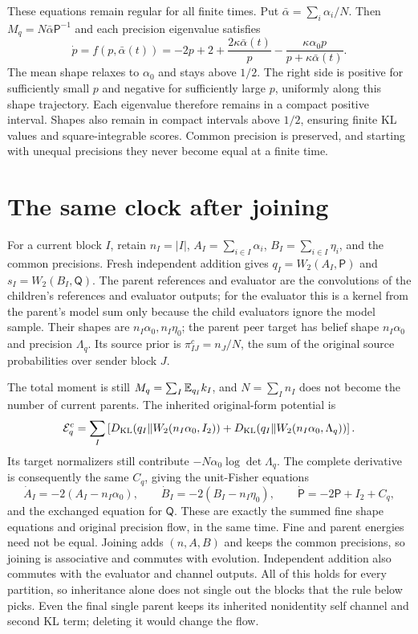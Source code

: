 These equations remain regular for all finite times. Put $\bar\alpha=\sum_i\alpha_i/N$. Then $M_q=N\bar\alpha\mathsf P^{-1}$ and each precision eigenvalue satisfies
\begin{equation}
 \dot p=f(p,\bar\alpha(t))
 =-2p+2+\frac{2\kappa\bar\alpha(t)}p
 -\frac{\kappa\alpha_0p}{p+\kappa\bar\alpha(t)}.
 \label{cf:eigenvalue}
\end{equation}
The mean shape relaxes to $\alpha_0$ and stays above $1/2$. The right side is positive for sufficiently small $p$ and negative for sufficiently large $p$, uniformly along this shape trajectory. Each eigenvalue therefore remains in a compact positive interval. Shapes also remain in compact intervals above $1/2$, ensuring finite KL values and square-integrable scores. Common precision is preserved, and starting with unequal precisions they never become equal at a finite time.

\section{The same clock after joining}
\label{cf:parent}

For a current block $I$, retain $n_I=|I|$, $A_I=\sum_{i\in I}\alpha_i$, $B_I=\sum_{i\in I}\eta_i$, and the common precisions. Fresh independent addition gives $q_I=W_2(A_I,\mathsf P)$ and $s_I=W_2(B_I,\mathsf Q)$. The parent references and evaluator are the convolutions of the children's references and evaluator outputs; for the evaluator this is a kernel from the parent's model sum only because the child evaluators ignore the model sample. Their shapes are $n_I\alpha_0,n_I\eta_0$; the parent peer target has belief shape $n_I\alpha_0$ and precision $\Lambda_q$. Its source prior is $\pi^c_{IJ}=n_J/N$, the sum of the original source probabilities over sender block $J$.

The total moment is still $M_q=\sum_I\mathbb E_{q_I}k_I$, and $N=\sum_In_I$ does not become the number of current parents. The inherited original-form potential is
\begin{equation}
 \mathcal E_q^c=\sum_I\left[
 D_{\mathrm{KL}}(q_I\Vert W_2(n_I\alpha_0,I_2))
 +D_{\mathrm{KL}}(q_I\Vert W_2(n_I\alpha_0,\Lambda_q))\right].
\end{equation}
Its target normalizers still contribute $-N\alpha_0\log\det\Lambda_q$. The complete derivative is consequently the same $C_q$, giving the unit-Fisher equations
\begin{equation}
 \dot A_I=-2(A_I-n_I\alpha_0),
 \qquad \dot B_I=-2(B_I-n_I\eta_0),
 \qquad \dot{\mathsf P}=-2\mathsf P+I_2+C_q,
 \label{cf:parent-flow}
\end{equation}
and the exchanged equation for $\mathsf Q$. These are exactly the summed fine shape equations and original precision flow, in the same time. Fine and parent energies need not be equal. Joining adds $(n,A,B)$ and keeps the common precisions, so joining is associative and commutes with evolution. Independent addition also commutes with the evaluator and channel outputs. All of this holds for every partition, so inheritance alone does not single out the blocks that the rule below picks. Even the final single parent keeps its inherited nonidentity self channel and second KL term; deleting it would change the flow.

